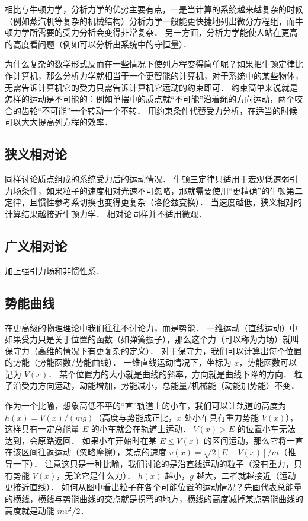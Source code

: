 相比与牛顿力学，分析力学的优势主要有点，一是当计算的系统越来越复杂的时候（例如蒸汽机等复杂的机械结构）分析力学一般能更快捷地列出微分方程组，而牛顿力学所需要的受力分析会变得非常复杂． 另一方面，分析力学能使人站在更高的高度看问题（例如可以分析出系统中的守恒量）．

为什么复杂的数学形式反而在一些情况下使列方程变得简单呢？如果把牛顿定律比作计算机，那么分析力学就相当于一个更智能的计算机，对于系统中的某些物体，无需告诉计算机它的受力只需告诉计算机它运动的约束即可． 约束简单来说就是怎样的运动是不可能的：例如单摆中的质点就“不可能”沿着绳的方向运动，两个咬合的齿轮“不可能”一个转动一个不转． 用约束条件代替受力分析，在适当的时候可以大大提高列方程的效率．

\subsection{狭义相对论}
同样讨论质点组成的系统受力后的运动情况． 牛顿三定律只适用于宏观低速弱引力场条件，如果粒子的速度相对光速不可忽略，那就需要使用“更精确”的牛顿第二定律，且惯性参考系切换也变得更复杂（洛伦兹变换）． 当速度越低，狭义相对的计算结果越接近牛顿力学． 相对论同样并不适用微观．

\subsection{广义相对论}
加上强引力场和非惯性系．

\subsection{势能曲线}
在更高级的物理理论中我们往往不讨论力，而是势能． 一维运动（直线运动）中如果受力只是关于位置的函数（如弹簧振子），那么这个力（可以称为力场）就叫保守力（高维的情况下有更复杂的定义）． 对于保守力，我们可以计算出每个位置的势能（势能函数/势能曲线）． 一维直线运动情况下，坐标为 $x$，势能函数可以记为 $V(x)$． 某个位置力的大小就是曲线的斜率，方向就是曲线下降的方向． 粒子沿受力方向运动，动能增加，势能减小，总能量/机械能（动能加势能）不变．

作为一个比喻，想象高低不平的“直”轨道上的小车，我们可以让轨道的高度为 $h(x) = V(x)/(mg)$（高度与势能成正比，$x$ 处小车具有重力势能 $V(x)$），这样具有一定总能量 $E$ 的小车就会在轨道上运动． $V(x) > E$ 的位置小车无法达到，会原路返回． 如果小车开始时在某 $E \leq V(x)$ 的区间运动，那么它将一直在该区间往返运动（忽略摩擦），某点的速度 $v(x) = \sqrt{2[E - V(x)]/m}$（推导一下）． 注意这只是一种比喻，我们讨论的是沿直线运动的粒子（没有重力，只有势能 $V(x)$，无论它是什么力）． $h(x)$ 越小，$g$ 越大，二者就越接近（运动更接近直线）． 如何从图中看出粒子在各个可能位置的运动情况？先画代表总能量的横线，横线与势能曲线的交点就是拐弯的地方，横线的高度减掉某点势能曲线的高度就是动能 $mv^2/2$．

